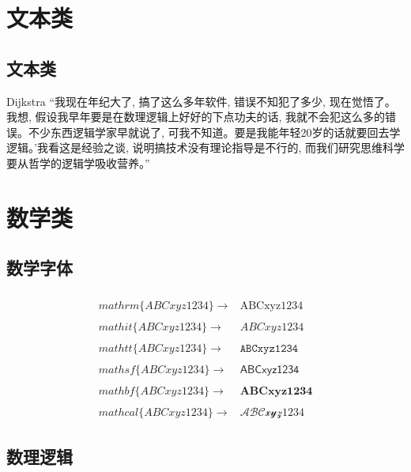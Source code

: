 \documentclass[math,logic,quote,code,mode=simple]{codedumpnote}
\begin{document}
	\frontmatter	%
	
	\mainmatter		%

\part{文本类}
\chapter{文本类}

\begin{pquotation}{Dijkstra}
“我现在年纪大了, 搞了这么多年软件, 错误不知犯了多少, 现在觉悟了。我想, 假设我早年要是在数理逻辑上好好的下点功夫的话, 我就不会犯这么多的错误。不少东西逻辑学家早就说了, 可我不知道。要是我能年轻20岁的话就要回去学逻辑。’我看这是经验之谈, 说明搞技术没有理论指导是不行的, 而我们研究思维科学要从哲学的逻辑学吸收营养。”
\end{pquotation}

\part{数学类}
\chapter{数学字体}

$$
\begin{aligned}
&\\mathrm\{ABC xyz 1234\} \rightarrow & \mathrm{ABC xyz 1234} \\
&\\mathit\{ABC xyz 1234\} \to & \mathit{ABCxyz1234} \\
&\\mathtt\{ABC xyz 1234\} \to & \mathtt{ABCxyz1234} \\
&\\mathsf\{ABC xyz 1234\} \to & \mathsf{ABCxyz1234} \\
&\\mathbf\{ABC xyz 1234\} \to & \mathbf{ABCxyz1234} \\
&\\mathcal\{ABC xyz 1234\} \to & \mathcal{ABC xyz 1234}
\end{aligned} 	
$$

\chapter{数理逻辑}
\end{document}
